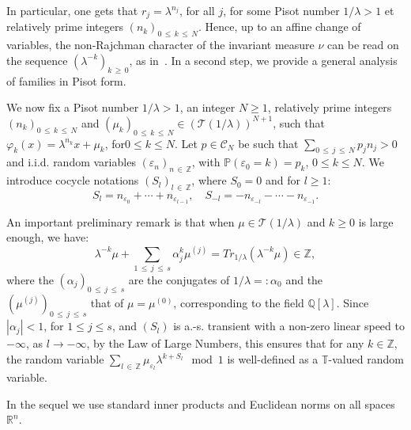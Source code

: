 \documentclass[AHL,Unicode,longabstracts,published]{cedram}
\newcommand{\Pbb}{\mathbb P}
\newcommand{\Tbb}{\mathbb T}
\newcommand{\Rbb}{\mathbb R}
\newcommand{\Qbb}{\mathbb Q}
\newcommand{\Zbb}{\mathbb Z}
\newcommand{\Ccl}{\mathcal{C}}
\newcommand{\Tcl}{\mathcal{T}}
\begin{document}
In particular, one gets that $r_j=\lambda^{n_j}$, for all $j$, for some Pisot number $1/\lambda>1$ et relatively prime integers $(n_k)_{0\,\leq\,k\,\leq\,N}$. Hence, up to an affine change of variables, the non-Rajchman character of the invariant measure $\nu$ can be read on the sequence $(\lambda^{-k})_{k\,\geq\,0}$, as in~\cite{erdos}. In a second step, we provide a general analysis of families in Pisot form.


We now fix a Pisot number $1/\lambda>1$, an integer $N\geq 1$, relatively prime integers $(n_k)_{0\,\leq\,k\,\leq\,N}$ and $(\mu_k)_{0\,\leq\,k\,\leq\, N}\in ({\Tcl}(1/\lambda))^{N+1}$, such that $\varphi_k(x)=\lambda^{n_k}x+\mu_k$, for\linebreak$0\leq k\leq N$. Let $p\in{\Ccl}_N$ be such that $\sum_{0\,\leq\,j\,\leq\,N}p_jn_j>0$ and i.i.d. random variables $(\varepsilon_n)_{n\,\in\,\Zbb}$, with $\Pbb(\varepsilon_0=k)=p_k$, $0\leq k\leq N$. We introduce cocycle notations $(S_l)_{l\,\in\,\Zbb}$, where $S_0=0$ and for $l\geq1$:
\[
S_l=n_{\varepsilon_0}+\cdots+n_{\varepsilon_{l-1}},\quad S_{-l}=-n_{\varepsilon_{-l}}-\cdots-n_{\varepsilon_{-1}}.
\]


An important preliminary remark is that when $\mu\in{\Tcl}(1/\lambda)$ and $k\geq0$ is large enough, we have:
\[
\lambda^{-k}\mu+\sum_{1\,\leq\,j\,\leq\,s}\alpha_j^k\mu^{(j)}=Tr_{1/\lambda}(\lambda^{-k}\mu)\in\Zbb,
\]
where the $(\alpha_j)_{0\,\leq\,j\,\leq\,s}$ are the conjugates of $1/\lambda=:\alpha_0$ and the $(\mu^{(j)})_{0\,\leq\,j\,\leq\,s}$ that of $\mu=\mu^{(0)}$, corresponding to the field $\Qbb[\lambda]$. Since $|\alpha_j|<1$, for $1\leq j\leq s$, and $(S_l)$ is a.-s. transient with a non-zero linear speed to $-\infty$, as $l\rightarrow-\infty$, by the Law of Large Numbers, this ensures that for any $k\in\Zbb$, the random variable $\sum_{l\,\in\,\Zbb}\mu_{\varepsilon_l}\lambda^{k+S_l}\mod 1$ is well-defined as a $\Tbb$-valued random variable.


In the sequel we use standard inner products and Euclidean norms on all spaces $\Rbb^n$.
\end{document}
